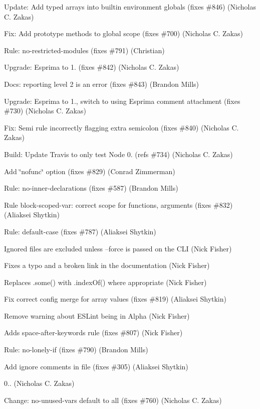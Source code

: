 \begin{DoxyItemize}
\item Update\+: Add typed arrays into builtin environment globals (fixes \#846) (Nicholas C. Zakas)
\item Fix\+: Add prototype methods to global scope (fixes \#700) (Nicholas C. Zakas)
\item Rule\+: no-\/restricted-\/modules (fixes \#791) (Christian)
\item Upgrade\+: Esprima to 1. (fixes \#842) (Nicholas C. Zakas)
\item Docs\+: reporting level 2 is an error (fixes \#843) (Brandon Mills)
\item Upgrade\+: Esprima to 1., switch to using Esprima comment attachment (fixes \#730) (Nicholas C. Zakas)
\item Fix\+: Semi rule incorrectly flagging extra semicolon (fixes \#840) (Nicholas C. Zakas)
\item Build\+: Update Travis to only test Node 0. (refs \#734) (Nicholas C. Zakas)
\item Add \char`\"{}nofunc\char`\"{} option (fixes \#829) (Conrad Zimmerman)
\item Rule\+: no-\/inner-\/declarations (fixes \#587) (Brandon Mills)
\item Rule \textquotesingle{}block-\/scoped-\/var\textquotesingle{}\+: correct scope for functions, arguments (fixes \#832) (Aliaksei Shytkin)
\item Rule\+: default-\/case (fixes \#787) (Aliaksei Shytkin)
\item Ignored files are excluded unless --force is passed on the C\+LI (Nick Fisher)
\item Fixes a typo and a broken link in the documentation (Nick Fisher)
\item Replaces .some() with .index\+Of() where appropriate (Nick Fisher)
\item Fix correct config merge for array values (fixes \#819) (Aliaksei Shytkin)
\item Remove warning about E\+S\+Lint being in Alpha (Nick Fisher)
\item Adds {\ttfamily space-\/after-\/keywords} rule (fixes \#807) (Nick Fisher)
\item Rule\+: no-\/lonely-\/if (fixes \#790) (Brandon Mills)
\item Add ignore comments in file (fixes \#305) (Aliaksei Shytkin)
\item 0.. (Nicholas C. Zakas)
\item Change\+: no-\/unused-\/vars default to \textquotesingle{}all\textquotesingle{} (fixes \#760) (Nicholas C. Zakas)
\end{DoxyItemize}

